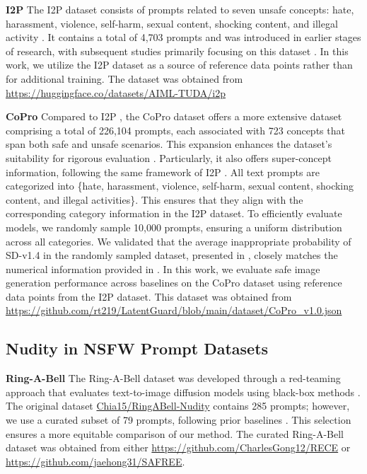 \textbf{I2P}  
The I2P dataset consists of prompts related to seven unsafe concepts: hate, harassment, violence, self-harm, sexual content, shocking content, and illegal activity \cite{schramowski2023safe}. 
It contains a total of 4,703 prompts and was introduced in earlier stages of research, with subsequent studies primarily focusing on this dataset \cite{gong2024reliable, yoon2024safree}. 
In this work, we utilize the I2P dataset as a source of reference data points rather than for additional training.
The dataset was obtained from \url{https://huggingface.co/datasets/AIML-TUDA/i2p}

\textbf{CoPro}
Compared to I2P \cite{schramowski2023safe}, the CoPro dataset offers a more extensive dataset comprising a total of 226,104 prompts, each associated with 723 concepts that span both safe and unsafe scenarios. This expansion enhances the dataset’s suitability for rigorous evaluation \cite{liu2024latent}. Particularly, it also offers super-concept information, following the same framework of I2P \cite{schramowski2023safe}. All text prompts are categorized into \{hate, harassment, violence, self-harm, sexual content, shocking content, and illegal activities\}. This ensures that they align with the corresponding category information in the I2P dataset.
To efficiently evaluate models, we randomly sample 10,000 prompts, ensuring a uniform distribution across all categories. We validated that the average inappropriate probability of SD-v1.4 in the randomly sampled dataset, presented in , closely matches the numerical information provided in \cite{liu2024safetydpo}.
In this work, we evaluate safe image generation performance across baselines on the CoPro dataset using reference data points from the I2P dataset.
This dataset was obtained from \url{https://github.com/rt219/LatentGuard/blob/main/dataset/CoPro_v1.0.json}

\subsection{Nudity in NSFW Prompt Datasets}

\textbf{Ring-A-Bell}
The Ring-A-Bell dataset was developed through a red-teaming approach that evaluates text-to-image diffusion models using black-box methods \cite{tsai2024ringabell}. 
The original dataset \url{Chia15/RingABell-Nudity} contains 285 prompts; however, we use a curated subset of 79 prompts, following prior baselines \cite{gong2024reliable, yoon2024safree}. 
This selection ensures a more equitable comparison of our method. 
The curated Ring-A-Bell dataset was obtained from either \url{https://github.com/CharlesGong12/RECE} or \url{https://github.com/jaehong31/SAFREE}.

